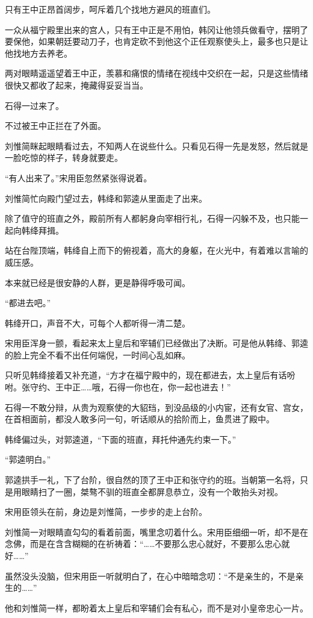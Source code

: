 只有王中正昂首阔步，呵斥着几个找地方避风的班直们。

一众从福宁殿里出来的宫人，只有王中正是不用怕，韩冈让他领兵做看守，摆明了要保他，如果朝廷要动刀子，也肯定砍不到他这个正任观察使头上，最多也只是让他找地方去养老。

两对眼睛遥遥望着王中正，羡慕和痛恨的情绪在视线中交织在一起，只是这些情绪很快又都收了起来，掩藏得妥妥当当。

石得一过来了。

不过被王中正拦在了外面。

刘惟简眯起眼睛看过去，不知两人在说些什么。只看见石得一先是发怒，然后就是一脸吃惊的样子，转身就要走。

“有人出来了。”宋用臣忽然紧张得说着。

刘惟简忙向殿门望过去，韩绛和郭逵从里面走了出来。

除了值守的班直之外，殿前所有人都躬身向宰相行礼，石得一闪躲不及，也只能一起向韩绛拜揖。

站在台陛顶端，韩绛自上而下的俯视着，高大的身躯，在火光中，有着难以言喻的威压感。

本来就已经是很安静的人群，更是静得呼吸可闻。

“都进去吧。”

韩绛开口，声音不大，可每个人都听得一清二楚。

宋用臣浑身一颤，看起来太上皇后和宰辅们已经做出了决断。可是他从韩绛、郭逵的脸上完全不看不出任何端倪，一时间心乱如麻。

只听见韩绛接着又补充道，“方才在福宁殿中的，现在都进去，太上皇后有话吩咐。张守约、王中正……哦，石得一你也在，你一起也进去！”

石得一不敢分辩，从贵为观察使的大貂珰，到没品级的小内宦，还有女官、宫女，在首相面前，都没人敢多问一句，听话顺从的拾阶而上，鱼贯进了殿中。

韩绛偏过头，对郭逵道，“下面的班直，拜托仲通先约束一下。”

“郭逵明白。”

郭逵拱手一礼，下了台阶，很自然的顶了王中正和张守约的班。当朝第一名将，只是用眼睛扫了一圈，桀骜不驯的班直全都屏息恭立，没有一个敢抬头对视。

宋用臣领头在前，身边是刘惟简，一步步的走上台阶。

刘惟简一对眼睛直勾勾的看着前面，嘴里念叨着什么。宋用臣细细一听，却不是在念佛，而是在含含糊糊的在祈祷着：“……不要那么忠心就好，不要那么忠心就好……”

虽然没头没脑，但宋用臣一听就明白了，在心中暗暗念叨：“不是亲生的，不是亲生的……”

他和刘惟简一样，都盼着太上皇后和宰辅们会有私心，而不是对小皇帝忠心一片。

